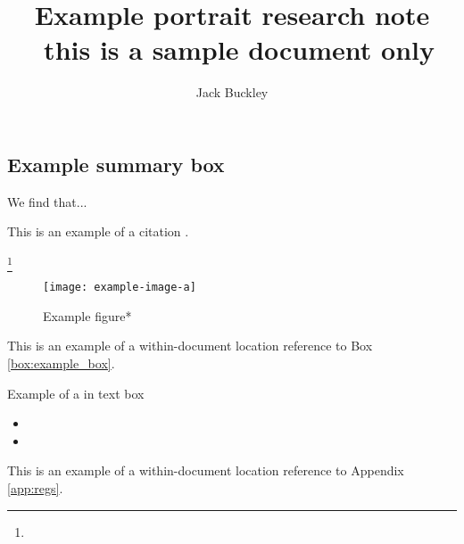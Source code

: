 \documentclass[10pt,openany,leqno]{e61-portrait-research-note}
\begin{document}
\baselineskip=14pt
\emergencystretch=5pt
\sloppy

\title{Example portrait research note ~\newline this is a sample document only}
\author{Jack Buckley}

\maketitle

\begin{summarybox}
\subsection*{Example summary box}\vspace{0.1cm}
We find that...
\end{summarybox}

\lipsum[1] 

This is an example of a citation \parencite{Fitzgerald20,Ziffer20}.

\lipsum[2]\footnote{\lipsum[3]}

\begin{figure}[h]
\caption{Example figure*}
\label{fig:example_a}
\texttt{[image: example-image-a]}\centering
\end{figure}

This is an example of a within-document location reference to Box \ref{box:example_box}. 

\begin{Boxx}[label=box:example_box]{Example of a in text box}
\lipsum[][1-2]
\begin{itemize}[noitemsep]
    \item \lipsum[2][1]
    \item \lipsum[3][1]
\end{itemize}
\end{Boxx}

\lipsum[4] This is an example of a within-document location reference to Appendix \ref{app:regs}. 
\end{document}
